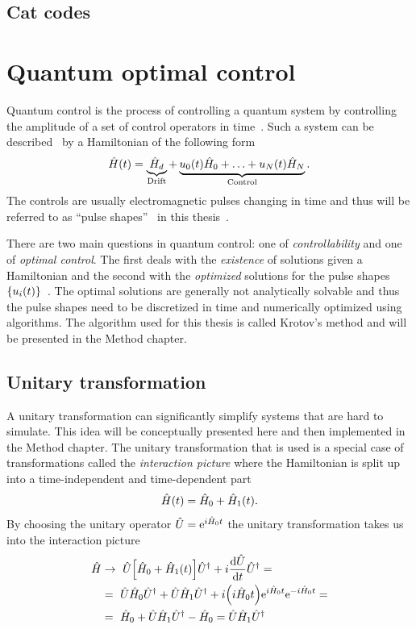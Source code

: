 \documentclass[main.tex]{subfiles}
\begin{document}
\subsection{Cat codes}


\section{Quantum optimal control}
Quantum control is the process of controlling a quantum system by controlling the amplitude of a set of control operators in time~\cite{fisher_optimal_2010}.
Such a system can be described~\cite{fisher_optimal_2010} by a Hamiltonian of the following form
\begin{equation}
    \hat{H}(t) = \underbrace{\hat{H}_d}_{\text{Drift}} + \underbrace{u_0(t)\hat{H}_0 + \dotsc + u_N(t)\hat{H}_N}_{\text{Control}}.
    \label{eq:optimal-control-hamiltonian}
\end{equation}
The controls are usually electromagnetic pulses changing in time and thus will be referred to as ``pulse shapes''~\cite{fisher_optimal_2010} in this thesis~.

There are two main questions in quantum control: one of \emph{controllability} and one of \emph{optimal control}.
The first deals with the \emph{existence} of solutions given a Hamiltonian and the second with the \emph{optimized} solutions for the pulse shapes \(\qty{u_i(t)}\)~\cite{dalessandro_introduction_2007}.
The optimal solutions are generally not analytically solvable and thus the pulse shapes need to be discretized in time and numerically optimized using algorithms.
The algorithm used for this thesis is called Krotov's method and will be presented in the Method chapter.

\subsection{Unitary transformation}
A unitary transformation can significantly simplify systems that are hard to simulate.
This idea will be conceptually presented here and then implemented in the Method chapter.
The unitary transformation that is used is a special case of transformations called the \emph{interaction picture} where the Hamiltonian is split up into a time-independent and time-dependent part
\begin{equation}
    \hat{H}(t) = \hat{H}_0 + \hat{H}_1(t).
\end{equation}
By choosing the unitary operator \( \hat{U} = \mathrm{e}^{i \hat{H}_0 t} \) the unitary transformation takes us into the interaction picture
\begin{align*}
    \hat{H} &\rightarrow~ \hat{U}\qty[ \hat{H}_0  + \hat{H}_1(t)]\hat{U}^\dagger + i\dv{\hat{U}}{t}\hat{U}^\dagger =\\
    &=~ \hat{U}\hat{H}_0\hat{U}^\dagger + \hat{U}\hat{H}_1\hat{U}^\dagger + i\qty(i\hat{H}_0 t)\mathrm{e}^{i \hat{H}_0 t}\mathrm{e}^{-i\hat{H}_0 t}=\\
    &=~ \hat{H}_0 + \hat{U}\hat{H}_1\hat{U}^\dagger - \hat{H}_0 = \hat{U}\hat{H}_1\hat{U}^\dagger
\end{align*}
\end{document}
